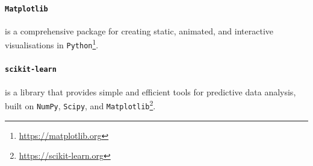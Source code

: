 \paragraph*{\texttt{Matplotlib}} is a comprehensive package for creating 
static, animated, and interactive visualisations in 
\texttt{Python}\footnote{\url{https://matplotlib.org}}. 

\paragraph*{\texttt{scikit-learn}} is a library that provides simple and efficient 
tools for predictive data analysis, built on \texttt{NumPy}, \texttt{Scipy}, and 
\texttt{Matplotlib}\footnote{\url{https://scikit-learn.org}}.



